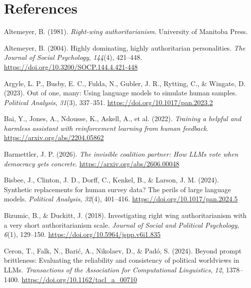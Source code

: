 \documentclass[
]{article}
\newlength{\cslhangindent}
\newenvironment{CSLReferences}[2] %
 {\begin{list}{}{%
  \setlength{\itemindent}{0pt}
  \setlength{\leftmargin}{0pt}
  \setlength{\parsep}{0pt}
  \ifodd #1
   \setlength{\leftmargin}{\cslhangindent}
   \setlength{\itemindent}{-1\cslhangindent}
  \fi
  \setlength{\itemsep}{#2\baselineskip}}}
 {\end{list}}
\begin{document}
\section*{References}\label{references}

\protect{}\label{refs}
\begin{CSLReferences}{1}{0}
Altemeyer, B. (1981). \emph{Right-wing authoritarianism}. University of
Manitoba Press.

Altemeyer, B. (2004). Highly dominating, highly authoritarian
personalities. \emph{The Journal of Social Psychology}, \emph{144}(4),
421--448. \url{https://doi.org/10.3200/SOCP.144.4.421-448}

Argyle, L. P., Busby, E. C., Fulda, N., Gubler, J. R., Rytting, C., \&
Wingate, D. (2023). Out of one, many: Using language models to simulate
human samples. \emph{Political Analysis}, \emph{31}(3), 337--351.
\url{https://doi.org/10.1017/pan.2023.2}

{Bai, Y., Jones, A., Ndousse, K., Askell, A., et al.} (2022).
\emph{Training a helpful and harmless assistant with reinforcement
learning from human feedback}. \url{https://arxiv.org/abs/2204.05862}

Barmettler, J. P. (2026). \emph{The invisible coalition partner: How
{LLMs} vote when democracy gets concrete}.
\url{https://arxiv.org/abs/2606.00048}

Bisbee, J., Clinton, J. D., Dorff, C., Kenkel, B., \& Larson, J. M.
(2024). Synthetic replacements for human survey data? {The} perils of
large language models. \emph{Political Analysis}, \emph{32}(4),
401--416. \url{https://doi.org/10.1017/pan.2024.5}

Bizumic, B., \& Duckitt, J. (2018). Investigating right wing
authoritarianism with a very short authoritarianism scale. \emph{Journal
of Social and Political Psychology}, \emph{6}(1), 129--150.
\url{https://doi.org/10.5964/jspp.v6i1.835}

Ceron, T., Falk, N., Barić, A., Nikolaev, D., \& Padó, S. (2024). Beyond
prompt brittleness: Evaluating the reliability and consistency of
political worldviews in {LLMs}. \emph{Transactions of the Association
for Computational Linguistics}, \emph{12}, 1378--1400.
\url{https://doi.org/10.1162/tacl_a_00710}


\end{CSLReferences}
\end{document}
